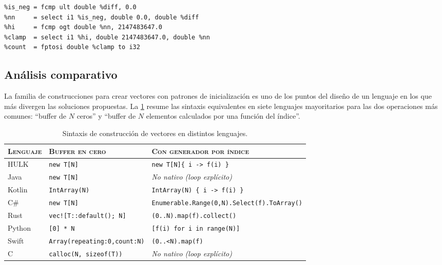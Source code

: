 \documentclass[11pt,a4paper,oneside,openany]{report}
\newcommand{\code}[1]{\texttt{#1}}
\begin{document}
\begin{lstlisting}[style=llvmst, caption={Clamp del count para evitar poison en fptosi.}]
%diff   = fsub double %end, %start
%is_neg = fcmp ult double %diff, 0.0
%nn     = select i1 %is_neg, double 0.0, double %diff
%hi     = fcmp ogt double %nn, 2147483647.0
%clamp  = select i1 %hi, double 2147483647.0, double %nn
%count  = fptosi double %clamp to i32
\end{lstlisting}

\subsection{Análisis comparativo}

La familia de construcciones para crear vectores con patrones de
inicialización es uno de los puntos del diseño de un lenguaje en los que
más divergen las soluciones propuestas. La \cref{tab:vec-lang} resume las
sintaxis equivalentes en siete lenguajes mayoritarios para las dos
operaciones más comunes: ``buffer de $N$ ceros'' y ``buffer de $N$
elementos calculados por una función del índice''.

\begin{table}[H]
\centering
\caption{Sintaxis de construcción de vectores en distintos lenguajes.}
\label{tab:vec-lang}
\begin{tabularx}{\textwidth}{lXX}
\toprule
\textsc{Lenguaje} & \textsc{Buffer en cero} & \textsc{Con generador por índice} \\
\midrule
HULK    & \code{new T[N]}                & \code{new T[N]\{ i -> f(i) \}} \\
Java    & \code{new T[N]}                & \emph{No nativo (loop explícito)} \\
Kotlin  & \code{IntArray(N)}             & \code{IntArray(N) \{ i -> f(i) \}} \\
C\#     & \code{new T[N]}                & \code{Enumerable.Range(0,N).Select(f).ToArray()} \\
Rust    & \code{vec![T::default(); N]}   & \code{(0..N).map(f).collect()} \\
Python  & \code{[0] * N}                 & \code{[f(i) for i in range(N)]} \\
Swift   & \code{Array(repeating:0,count:N)} & \code{(0..<N).map(f)} \\
C       & \code{calloc(N, sizeof(T))}    & \emph{No nativo (loop explícito)} \\
\bottomrule
\end{tabularx}
\end{table}
\end{document}

